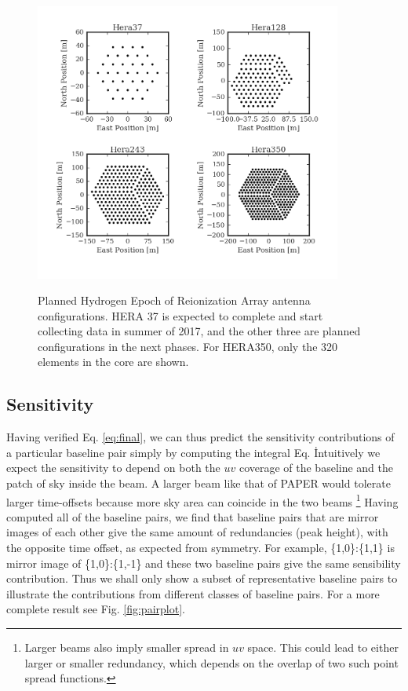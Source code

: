 \documentclass[twocolumn,apj,numberedappendix]{emulateapj}
\renewcommand\[{\begin{equation}}
\renewcommand\]{\end{equation}}
\begin{document}
\begin{figure}[h!]
\includegraphics[width=0.9\textwidth]{HeraAntpos}
\label{fig:HeraAntpos}
\caption{Planned Hydrogen Epoch of Reionization Array antenna configurations. HERA 37 is expected to complete and start collecting data in summer of 2017, and the other three are planned configurations in the next phases. For HERA350, only the 320 elements in the core are shown. }
\end{figure}

\subsection{ Sensitivity \label{sec:sensitivity}}

Having verified Eq. \eqref{eq:final}, we can thus predict the sensitivity contributions of a
particular baseline pair simply by computing the integral Eq. \.
Intuitively we expect the sensitivity to depend on both the $uv$ coverage of the baseline and the patch of sky inside the beam. A larger beam like that of PAPER would tolerate larger time-offsets because more sky area can coincide in the two beams \footnote{Larger beams also imply smaller spread in $uv$ space. This could lead to either larger or smaller redundancy, which depends on the overlap of two such point spread functions.}
Having computed all of the baseline pairs, we find that baseline pairs that are mirror images of each other 
give the same amount of redundancies (peak height), with the opposite time offset, as expected from symmetry. 
For example, \{1,0\}:\{1,1\} is mirror image of \{1,0\}:\{1,-1\} and these two baseline pairs
give the same sensibility contribution. Thus we shall only show a subset of representative baseline pairs to illustrate the contributions from different classes of baseline pairs. For a more complete result see Fig. \ref{fig:pairplot}.  
\end{document}
